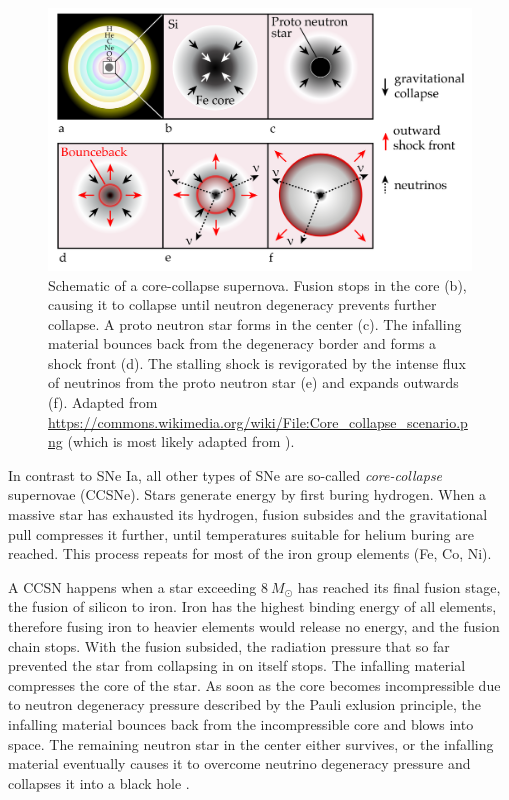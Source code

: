 \documentclass[
    a4paper, %
    fontsize=10pt, %
    twoside=false, %
    numbers=noenddot, %
    fontmethod=tex,
]{kaobook}
\begin{document}
\begin{figure}[htb]
    \includegraphics{theory/ccsn.pdf}
    \caption[Core-collapse supernova]{Schematic of a core-collapse supernova. Fusion stops in the core (b), causing it to collapse until neutron degeneracy prevents further collapse. A proto neutron star forms in the center (c). The infalling material bounces back from the degeneracy border and forms a shock front (d). The stalling shock is revigorated by the intense flux of neutrinos from the proto neutron star (e) and expands outwards (f). Adapted from \url{https://commons.wikimedia.org/wiki/File:Core_collapse_scenario.png} (which is most likely adapted from \cite{Janka2012}).}
\end{figure}

In contrast to SNe Ia, all other types of SNe are so-called \textit{core-collapse} supernovae (CCSNe).
Stars generate energy by first buring hydrogen. When a massive star has exhausted its hydrogen, fusion subsides and the gravitational pull compresses it further, until temperatures suitable for helium buring are reached. This process repeats for most of the iron group elements (Fe, Co, Ni).

A CCSN happens when a star exceeding $8~M_\odot$ has reached its final fusion stage, the fusion of silicon to iron. Iron has the highest binding energy of all elements, therefore fusing iron to heavier elements would release no energy, and the fusion chain stops. With the fusion subsided, the radiation pressure that so far prevented the star from collapsing in on itself stops. The infalling material compresses the core of the star. As soon as the core becomes incompressible due to neutron degeneracy pressure described by the Pauli exlusion principle, the infalling material bounces back from the incompressible core and blows into space. The remaining neutron star in the center either survives, or the infalling material eventually causes it to overcome neutrino degeneracy pressure and collapses it into a black hole \cite{Alsabti2017}.
\end{document}
